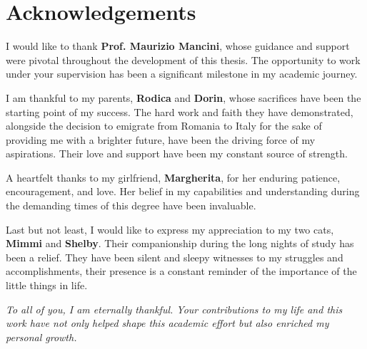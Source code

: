\chapter*{Acknowledgements}


    I would like to thank \textbf{Prof. Maurizio Mancini}, whose guidance
    and support were pivotal throughout the development of this thesis. The opportunity to work under your supervision has been a significant milestone in my academic journey.
   
    \vspace{2mm} 
    
    \noindent I am thankful to my parents, \textbf{Rodica} and \textbf{Dorin}, whose 
    sacrifices have been the starting point of my success. The hard work and faith they have demonstrated, alongside the decision to emigrate from Romania to Italy for the sake of providing me with a brighter future, have been the driving force of my aspirations. Their love and support have been my constant source of strength.
    
    \vspace{2mm}

    \noindent A heartfelt thanks to my girlfriend, \textbf{Margherita}, for her enduring patience, encouragement, and love. Her belief in my capabilities and understanding during the demanding times of this degree have been invaluable. 

    \vspace{2mm}
  
    \noindent Last but not least, I would like to express my appreciation to my two cats, \textbf{Mimmi} and \textbf{Shelby}. Their companionship during the long nights of study has been a relief. They have been silent and sleepy witnesses to my struggles and accomplishments, their presence is a constant reminder of the importance of the little things in life.

    \vspace{2mm}

    \textit{To all of you, I am eternally thankful. Your contributions to my life and this work have
    not only helped shape this academic effort but also enriched my personal growth.}